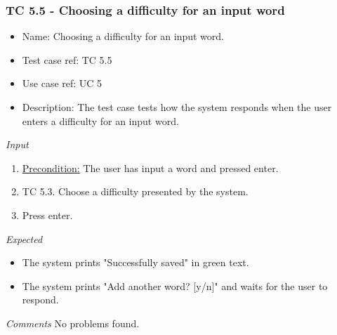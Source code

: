 \documentclass[12pt, letterpaper]{article}
\begin{document}
\subsubsection{TC 5.5 - Choosing a difficulty for an input word}
\begin{itemize}
	\item Name: Choosing a difficulty for an input word.
	\item Test case ref: TC 5.5
	\item Use case ref: UC 5
	\item Description: The test case tests how the system responds when the user enters a difficulty for an input word.
\end{itemize}
\emph{Input}
\begin{enumerate}
	\item \underline{Precondition:} The user has input a word and pressed enter.
	\item TC 5.3. Choose a difficulty presented by the system.
	\item Press enter.
\end{enumerate}
\emph{Expected}
\begin{itemize}
	\item The system prints "Successfully saved" in green text.
	\item The system prints "Add another word? [y/n]" and waits for the user to respond.
\end{itemize}
\begin{Form}
\newline
{}
\newline
\end{Form}
\newline
\emph{Comments}
No problems found.
\end{document}

